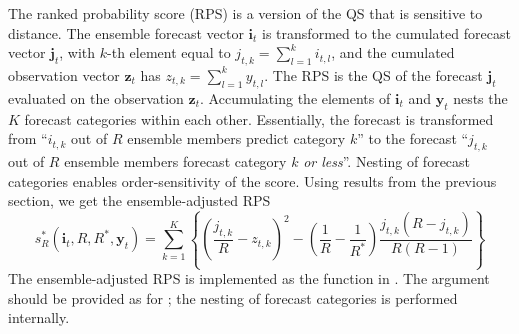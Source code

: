 \documentclass[article]{jss}\usepackage[]{graphicx}\usepackage[]{color}
\begin{document}
The ranked probability score (RPS) is a version of the QS that is sensitive to distance.
The ensemble forecast vector $\mathbf{i}_t$ is transformed to the cumulated forecast vector $\mathbf{j}_t$, with $k$-th element equal to $j_{t,k} = \sum_{l=1}^k i_{t,l}$, and the cumulated observation vector $\mathbf{z}_t$ has $z_{t,k} = \sum_{l=1}^k y_{t,l}$.
The RPS is the QS of the forecast $\mathbf{j}_t$ evaluated on the observation $\mathbf{z}_t$.
Accumulating the elements of $\mathbf{i}_t$ and $\mathbf{y}_t$ nests the $K$ forecast categories within each other. 
Essentially, the forecast is transformed from ``$i_{t,k}$ out of $R$ ensemble members predict category $k$'' to the forecast ``$j_{t,k}$ out of $R$ ensemble members forecast category $k$ \emph{or less}''.
Nesting of forecast categories enables order-sensitivity of the score.
Using results from the previous section, we get the ensemble-adjusted RPS
%
\begin{equation}
s_{R}^*(\mathbf{i}_t, R, R^*, \mathbf{y}_t) = \sum_{k=1}^K \left\{ \left(\frac{j_{t,k}}{R} - z_{t,k}\right)^2 - \left(\frac{1}{R} - \frac{1}{R^*}\right) \frac{j_{t,k}(R-j_{t,k})}{R(R-1)}\right\}
\end{equation}
%
The ensemble-adjusted RPS is implemented as the function  in .
The argument  should be provided as for ; the nesting of forecast categories is performed internally.
\end{document}
